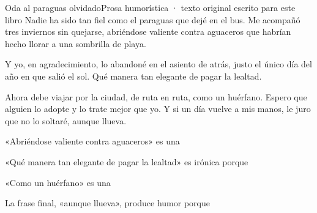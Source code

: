 \evaluacion
\begin{texto}{Oda al paraguas olvidado}{Prosa humorística · texto original escrito para este libro}
\pa Nadie ha sido tan fiel como el paraguas que dejé en el bus. Me acompañó tres inviernos sin quejarse, abriéndose
valiente contra aguaceros que habrían hecho llorar a una sombrilla de playa.

\pa Y yo, en agradecimiento, lo abandoné en el asiento de atrás, justo el único día del año en que salió el sol. Qué
manera tan elegante de pagar la lealtad.

\pa Ahora debe viajar por la ciudad, de ruta en ruta, como un huérfano. Espero que alguien lo adopte y lo trate mejor que
yo. Y si un día vuelve a mis manos, le juro que no lo soltaré, aunque llueva.
\end{texto}
\begin{ejercicios}
\item «Abriéndose valiente contra aguaceros»  es una
\item «Qué manera tan elegante de pagar la lealtad»  es irónica porque
\item «Como un huérfano»  es una
\item La frase final, «aunque llueva», produce humor porque
\end{ejercicios}
